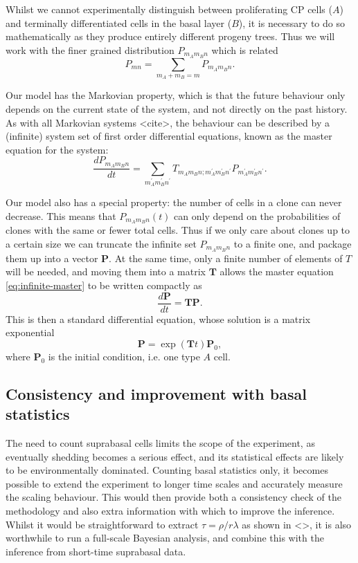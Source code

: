 \documentclass[10pt,UKenglish]{article}
\begin{document}
Whilst we cannot experimentally distinguish between proliferating CP cells ($A$) and terminally differentiated cells in the basal layer ($B$), it is necessary to do so mathematically as they produce entirely different progeny trees. Thus we will work with the finer grained distribution $P_{m_A m_B n}$ which is related $$P_{mn} = \sum_{m_A + m_B = m} P_{m_A m_B n}.$$ 

Our model has the Markovian property, which is that the future behaviour only depends on the current state of the system, and not directly on the past history. As with all Markovian systems <cite>, the behaviour can be described by a (infinite) system set of first order differential equations, known as the master equation for the system: 
\begin{equation}
\frac{dP_{m_A m_B n}}{dt} = \sum_{m_A^\prime m_B^\prime n^\prime} T_{m_A m_B n; m_A^\prime m_B^\prime n^\prime} P_{m_A^\prime m_B^\prime n^\prime}. \label{eq:infinite-master}
\end{equation}

Our model also has a special property: the number of cells in a clone can never decrease. This means that $P_{m_A m_B n}(t)$ can only depend on the probabilities of clones with the same or fewer total cells. Thus if we only care about clones up to a certain size we can truncate the infinite set $P_{m_A m_B n}$ to a finite one, and package them up into a vector $\mathbf P$. At the same time, only a finite number of elements of $T$ will be needed, and moving them into a matrix $\mathbf T$ allows the master equation \eqref{eq:infinite-master} to be written compactly as $$\frac{d\mathbf P}{dt} = \mathbf{T P}.$$ This is then a standard differential equation, whose solution is a matrix exponential $$\mathbf P = \exp(\mathbf T t) \mathbf P_0,$$ where $\mathbf P_0$ is the initial condition, i.e. one type $A$ cell.

\subsection{\label{sec:ball-plane}Consistency and improvement with basal statistics}

The need to count suprabasal cells limits the scope of the experiment, as eventually shedding becomes a serious effect, and its statistical effects are likely to be environmentally dominated. Counting basal statistics only, it becomes possible to extend the experiment to longer time scales and accurately measure the scaling behaviour. This would then provide both a consistency check of the methodology and also extra information with which to improve the inference. Whilst it would be straightforward to extract $\tau = \rho/r\lambda$ as shown in <>, it is also worthwhile to run a full-scale Bayesian analysis, and combine this with the inference from short-time suprabasal data.
\end{document}
